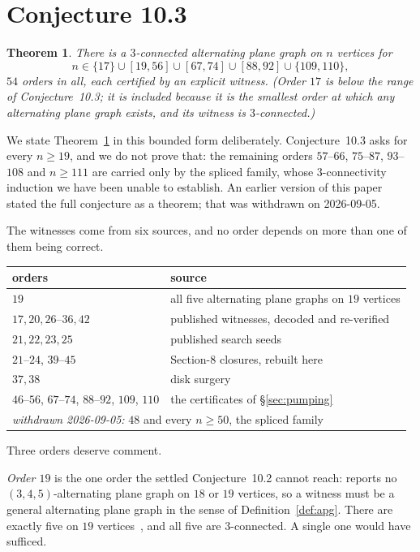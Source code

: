 \documentclass{baustms}
\theoremstyle{cupthm}
\newtheorem{theorem}{Theorem}[section]
\theoremstyle{cupdefn}
\theoremstyle{cuprem}
\begin{document}
\section{Conjecture 10.3}\label{sec:103}

\begin{theorem}\label{thm:103}
There is a $3$-connected alternating plane graph on $n$ vertices for
$$n \in \{17\} \cup [19,56] \cup [67,74] \cup [88,92] \cup \{109,110\},$$
$54$ orders in all, each certified by an explicit witness. (Order $17$ is
below the range of Conjecture~10.3; it is included because it is the smallest
order at which any alternating plane graph exists, and its witness is
$3$-connected.)
\end{theorem}

We state Theorem~\ref{thm:103} in this bounded form deliberately.
Conjecture~10.3 asks for every $n \ge 19$, and we do not prove that: the
remaining orders $57$--$66$, $75$--$87$, $93$--$108$ and $n \ge 111$ are carried
only by the spliced family, whose $3$-connectivity induction we have been unable
to establish. An earlier version of this paper stated the full conjecture as a
theorem; that was withdrawn on 2026-09-05.

The witnesses come from six sources, and no order depends on more than one of
them being correct.

\begin{center}
\begin{tabular}{ll}
\toprule
orders & source \\
\midrule
$19$ & all five alternating plane graphs on $19$ vertices \\
$17, 20, 26$--$36, 42$ & published witnesses, decoded and re-verified \\
$21, 22, 23, 25$ & published search seeds \\
$21$--$24$, $39$--$45$ & Section-8 closures, rebuilt here \\
$37, 38$ & disk surgery \\
$46$--$56$, $67$--$74$, $88$--$92$, $109$, $110$ & the certificates of \S\ref{sec:pumping} \\
\midrule
\multicolumn{2}{l}{\emph{withdrawn 2026-09-05:} $48$ and every $n \ge 50$, the spliced family} \\
\bottomrule
\end{tabular}
\end{center}

Three orders deserve comment.

\emph{Order $19$} is the one order the settled Conjecture~10.2 cannot reach:
\cite{AHSSV2015} reports no $(3,4,5)$-alternating plane graph on $18$ or $19$
vertices, so a witness must be a general alternating plane graph in the sense of
Definition~\ref{def:apg}. There are exactly five on $19$ vertices~\cite{HoG}, and all
five are $3$-connected. A single one would have sufficed.
\end{document}
